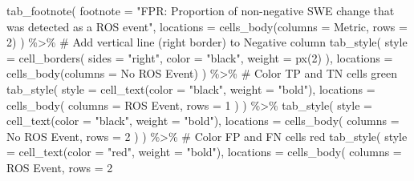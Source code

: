 \documentclass[
  10pt,
  letterpaper,
  DIV=11,
  numbers=noendperiod]{scrartcl}
\newenvironment{Shaded}{\begin{snugshade}}{\end{snugshade}}
\newcommand{\AttributeTok}[1]{\textcolor[rgb]{0.40,0.45,0.13}{#1}}
\newcommand{\CommentTok}[1]{\textcolor[rgb]{0.37,0.37,0.37}{#1}}
\newcommand{\DecValTok}[1]{\textcolor[rgb]{0.68,0.00,0.00}{#1}}
\newcommand{\FunctionTok}[1]{\textcolor[rgb]{0.28,0.35,0.67}{#1}}
\newcommand{\NormalTok}[1]{\textcolor[rgb]{0.00,0.23,0.31}{#1}}
\newcommand{\SpecialCharTok}[1]{\textcolor[rgb]{0.37,0.37,0.37}{#1}}
\newcommand{\StringTok}[1]{\textcolor[rgb]{0.13,0.47,0.30}{#1}}
\begin{document}
\begin{Shaded}
\begin{Highlighting}[]
  \FunctionTok{tab\_footnote}\NormalTok{(}
    \AttributeTok{footnote =} \StringTok{"FPR: Proportion of non{-}negative SWE change that was detected as a ROS event"}\NormalTok{,}
    \AttributeTok{locations =} \FunctionTok{cells\_body}\NormalTok{(}\AttributeTok{columns =}\NormalTok{ Metric, }\AttributeTok{rows =} \DecValTok{2}\NormalTok{)}
\NormalTok{  ) }\SpecialCharTok{\%\textgreater{}\%}
  \CommentTok{\# Add vertical line (right border) to Negative column}
  \FunctionTok{tab\_style}\NormalTok{(}
    \AttributeTok{style =} \FunctionTok{cell\_borders}\NormalTok{(}
      \AttributeTok{sides =} \StringTok{"right"}\NormalTok{,}
      \AttributeTok{color =} \StringTok{"black"}\NormalTok{,}
      \AttributeTok{weight =} \FunctionTok{px}\NormalTok{(}\DecValTok{2}\NormalTok{)}
\NormalTok{    ),}
    \AttributeTok{locations =} \FunctionTok{cells\_body}\NormalTok{(}\AttributeTok{columns =} \StringTok{\textasciigrave{}}\AttributeTok{No ROS Event}\StringTok{\textasciigrave{}}\NormalTok{)}
\NormalTok{  ) }\SpecialCharTok{\%\textgreater{}\%}
  \CommentTok{\# Color TP and TN cells green}
  \FunctionTok{tab\_style}\NormalTok{(}
    \AttributeTok{style =} \FunctionTok{cell\_text}\NormalTok{(}\AttributeTok{color =} \StringTok{"black"}\NormalTok{, }\AttributeTok{weight =} \StringTok{"bold"}\NormalTok{),}
    \AttributeTok{locations =} \FunctionTok{cells\_body}\NormalTok{(}
      \AttributeTok{columns =} \StringTok{\textasciigrave{}}\AttributeTok{ROS Event}\StringTok{\textasciigrave{}}\NormalTok{, }\AttributeTok{rows =} \DecValTok{1}
\NormalTok{    )}
\NormalTok{  ) }\SpecialCharTok{\%\textgreater{}\%}
  \FunctionTok{tab\_style}\NormalTok{(}
    \AttributeTok{style =} \FunctionTok{cell\_text}\NormalTok{(}\AttributeTok{color =} \StringTok{"black"}\NormalTok{, }\AttributeTok{weight =} \StringTok{"bold"}\NormalTok{),}
    \AttributeTok{locations =} \FunctionTok{cells\_body}\NormalTok{(}
      \AttributeTok{columns =} \StringTok{\textasciigrave{}}\AttributeTok{No ROS Event}\StringTok{\textasciigrave{}}\NormalTok{, }\AttributeTok{rows =} \DecValTok{2}
\NormalTok{    )}
\NormalTok{  ) }\SpecialCharTok{\%\textgreater{}\%}
  \CommentTok{\# Color FP and FN cells red}
  \FunctionTok{tab\_style}\NormalTok{(}
    \AttributeTok{style =} \FunctionTok{cell\_text}\NormalTok{(}\AttributeTok{color =} \StringTok{"red"}\NormalTok{, }\AttributeTok{weight =} \StringTok{"bold"}\NormalTok{),}
    \AttributeTok{locations =} \FunctionTok{cells\_body}\NormalTok{(}
      \AttributeTok{columns =} \StringTok{\textasciigrave{}}\AttributeTok{ROS Event}\StringTok{\textasciigrave{}}\NormalTok{, }\AttributeTok{rows =} \DecValTok{2}

\end{Highlighting}
\end{Shaded}
\end{document}
